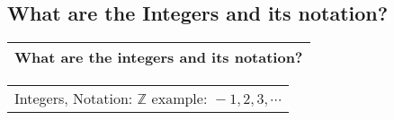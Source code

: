 \subsection{What are the Integers and its notation?}
\begin{small}
    \begin{tabularx}{1\textwidth}{
            p{}
        }
        \toprule
        What are the integers and its notation?
        \\
        \bottomrule

    \end{tabularx}
\end{small}
\begin{small}
    \begin{tabularx}{1\textwidth}{
            p{}
        }
        \toprule
            Integers, Notation: $\mathbb{Z} \text{ example: } -1, 2, 3, \cdots $\\

    \end{tabularx}
\end{small}
